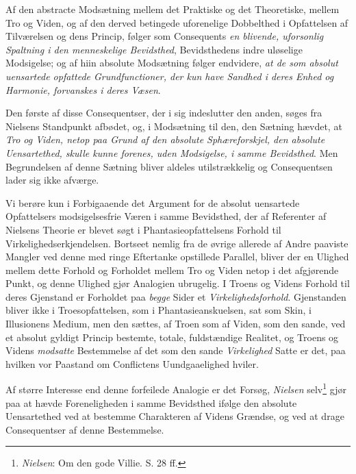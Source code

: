 \documentclass[12pt,a4paper]{book}
\newcommand{\opage}[1]{\marginnote{\footnotesize\textit{[#1]}}}
\begin{document}
Af den abstracte Modsætning mellem det Praktiske og det Theoretiske, mellem Tro og Viden, og
af den derved betingede uforenelige Dobbelthed i Opfattelsen af Tilværelsen og dens Princip,
følger som Consequents \emph{en blivende, uforsonlig Spaltning i den menneskelige
Bevidsthed}, Bevidsthedens indre uløselige Modsigelse; og af hiin absolute Modsætning følger
endvidere, \emph{at de som absolut uensartede opfattede Grundfunctioner, der kun have Sandhed
i deres Enhed og Harmonie, forvanskes i deres Væsen}.

Den første af disse Consequentser, der i sig indeslutter den anden, søges fra Nielsens
Standpunkt afbødet, og, i Modsætning til den, den Sætning hævdet, at \emph{Tro og Viden, netop paa Grund af den absolute Sphæreforskjel, den absolute Uensartethed, skulle kunne forenes,
uden Modsigelse, i samme Bevidsthed}. Men Begrundelsen af denne Sætning bliver aldeles
utilstrækkelig og Consequentsen lader sig ikke afværge.

Vi berøre kun i Forbigaaende det Argument for de absolut uensartede Opfattelsers
modsigelsesfrie Væren i samme Bevidsthed, der af Referenter af Nielsens Theorie er blevet
søgt i Phantasieopfattelsens Forhold til Virkelighedserkjendelsen. Bortseet nemlig fra de
øvrige allerede af Andre paaviste Mangler ved denne med ringe Eftertanke opstillede Parallel,
bliver der en Ulighed mellem dette Forhold og Forholdet mellem Tro og Viden netop i det
afgjørende Punkt, og denne Ulighed gjør Analogien ubrugelig. I Troens og Videns Forhold til
deres Gjenstand er Forholdet paa \emph{begge} Sider et \emph{Virkelighedsforhold}. Gjenstanden bliver ikke
i Troesopfattelsen, som i Phantasieanskuelsen, sat som Skin, i Illusionens Medium, men den
sættes, af Troen som af Viden, som den sande, ved et absolut \opage{179}gyldigt Princip bestemte,
totale, fuldstændige Realitet, og Troens og Videns \emph{modsatte} Bestemmelse af det som den sande \emph{Virkelighed} Satte er det, paa hvilken vor Paastand om Conflictens Uundgaaelighed
hviler.

Af større Interesse end denne forfeilede Analogie er det Forsøg, \emph{Nielsen} selv\footnote{\emph{Nielsen}: Om den gode Villie. S. 28 ff.} gjør paa at hævde Foreneligheden i samme Bevidsthed ifølge den
absolute Uensartethed ved at bestemme Charakteren af Videns Grændse, og ved at drage
Consequentser af denne Bestemmelse.
\end{document}
